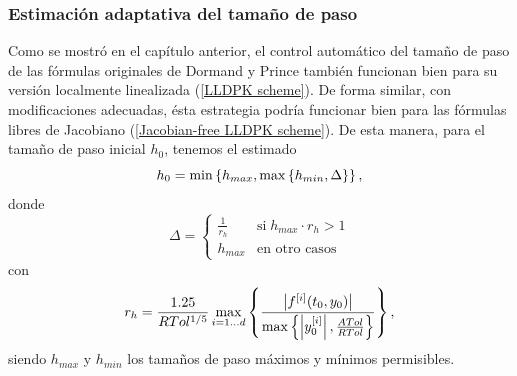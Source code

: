\subsubsection{Estimación adaptativa del tamaño de paso}\label{Sec:AdaptiveLLscheme}

Como se mostró en el capítulo anterior, el control automático del tamaño de paso de las fórmulas originales de Dormand y Prince también funcionan bien para su versión localmente linealizada (\ref{LLDPK scheme}). De forma similar, con modificaciones adecuadas, ésta estrategia podría funcionar bien para las fórmulas libres de Jacobiano (\ref{Jacobian-free LLDPK scheme}). De esta manera, para el tamaño de paso inicial $h_0$, tenemos el estimado
\begin{equation}
    h_0 = \min\left\{  h_{max}, \max\left\{  h_{min} ,\Delta \right\}  \right\}, \label{hcero-fj}
\end{equation}
donde
\begin{equation*}
    \Delta = \begin{cases}
        \frac{1}{r_h} & \text{si} \; h_{max}\cdot r_h>1\\
        h_{max} & \text{en otro casos}
        \end{cases}
\end{equation*}
con
\begin{equation*}
     r_h = \frac{1\mathord{.}25}{RTol^{1/5}}\max_{i=1\ldots d}\left\{\frac{ \left\lvert f^{[i]}(t_0,y_0) \right\rvert }
    {\max\left\{ \left\lvert y^{[i]}_0 \right\rvert ,\frac{ATol}{RTol} \right\}}\right\},
\end{equation*}
siendo $h_{max}$ y $h_{min}$ los tamaños de paso máximos y mínimos permisibles.


